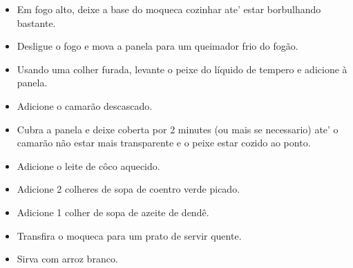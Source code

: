 \documentclass [11pt, letterpaper] {article}
\begin{document}
\begin {description}
\begin {enumerate}
\begin {itemize}
\item Em fogo alto, deixe a base do moqueca cozinhar ate' estar borbulhando bastante. 
\item Desligue o fogo e mova a panela para um queimador frio do fog\~ao.
\item Usando uma colher furada, levante o peixe do líquido de tempero e adicione \`a panela.
\item Adicione o camarão descascado.
\item Cubra a panela e deixe coberta por 2 minutes (ou mais se necessario) ate' o camar\~ao n\~ao estar mais transparente e o peixe estar cozido ao ponto.
\item Adicione o leite de c\^oco aquecido.
\item Adicione 2 colheres de sopa de coentro verde picado.
\item Adicione 1 colher de sopa de azeite de dend\^ e.
\item Transfira o moqueca para um prato de servir quente.
\item Sirva com arroz branco.
\end {itemize}
\end {enumerate}
\end {description}
\end{document}
